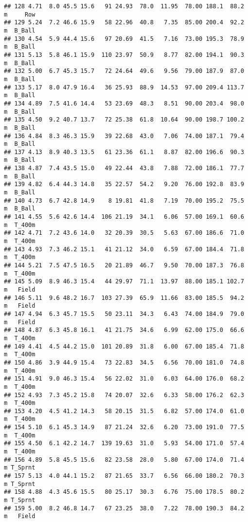 \documentclass[
]{article}
\begin{document}
\begin{verbatim}
## 128 4.71  8.0 45.5 15.6   91 24.93  78.0  11.95  78.00 188.1  88.2   m     Row
## 129 5.24  7.2 46.6 15.9   58 22.96  40.8   7.35  85.00 200.4  92.2   m  B_Ball
## 130 4.54  5.9 44.4 15.6   97 20.69  41.5   7.16  73.00 195.3  78.9   m  B_Ball
## 131 5.13  5.8 46.1 15.9  110 23.97  50.9   8.77  82.00 194.1  90.3   m  B_Ball
## 132 5.00  6.7 45.3 15.7   72 24.64  49.6   9.56  79.00 187.9  87.0   m  B_Ball
## 133 5.17  8.0 47.9 16.4   36 25.93  88.9  14.53  97.00 209.4 113.7   m  B_Ball
## 134 4.89  7.5 41.6 14.4   53 23.69  48.3   8.51  90.00 203.4  98.0   m  B_Ball
## 135 4.50  9.2 40.7 13.7   72 25.38  61.8  10.64  90.00 198.7 100.2   m  B_Ball
## 136 4.84  8.3 46.3 15.9   39 22.68  43.0   7.06  74.00 187.1  79.4   m  B_Ball
## 137 4.13  8.9 40.3 13.5   61 23.36  61.1   8.87  82.00 196.6  90.3   m  B_Ball
## 138 4.87  7.4 43.5 15.0   49 22.44  43.8   7.88  72.00 186.1  77.7   m  B_Ball
## 139 4.82  6.4 44.3 14.8   35 22.57  54.2   9.20  76.00 192.8  83.9   m  B_Ball
## 140 4.73  6.7 42.8 14.9    8 19.81  41.8   7.19  70.00 195.2  75.5   m  B_Ball
## 141 4.55  5.6 42.6 14.4  106 21.19  34.1   6.06  57.00 169.1  60.6   m  T_400m
## 142 4.71  7.2 43.6 14.0   32 20.39  30.5   5.63  67.00 186.6  71.0   m  T_400m
## 143 4.93  7.3 46.2 15.1   41 21.12  34.0   6.59  67.00 184.4  71.8   m  T_400m
## 144 5.21  7.5 47.5 16.5   20 21.89  46.7   9.50  70.00 187.3  76.8   m  T_400m
## 145 5.09  8.9 46.3 15.4   44 29.97  71.1  13.97  88.00 185.1 102.7   m   Field
## 146 5.11  9.6 48.2 16.7  103 27.39  65.9  11.66  83.00 185.5  94.2   m   Field
## 147 4.94  6.3 45.7 15.5   50 23.11  34.3   6.43  74.00 184.9  79.0   m   Field
## 148 4.87  6.3 45.8 16.1   41 21.75  34.6   6.99  62.00 175.0  66.6   m  T_400m
## 149 4.41  4.5 44.2 15.0  101 20.89  31.8   6.00  67.00 185.4  71.8   m  T_400m
## 150 4.86  3.9 44.9 15.4   73 22.83  34.5   6.56  70.00 181.0  74.8   m  T_400m
## 151 4.91  9.0 46.3 15.4   56 22.02  31.0   6.03  64.00 176.0  68.2   m  T_400m
## 152 4.93  7.3 45.2 15.8   74 20.07  32.6   6.33  58.00 176.2  62.3   m  T_400m
## 153 4.20  4.5 41.2 14.3   58 20.15  31.5   6.82  57.00 174.0  61.0   m  T_400m
## 154 5.10  6.1 45.3 14.9   87 21.24  32.6   6.20  73.00 191.0  77.5   m  T_400m
## 155 4.50  6.1 42.2 14.7  139 19.63  31.0   5.93  54.00 171.0  57.4   m  T_400m
## 156 4.89  5.8 45.5 15.6   82 23.58  28.0   5.80  67.00 174.0  71.4   m T_Sprnt
## 157 5.13  4.0 44.1 15.2   87 21.65  33.7   6.56  66.00 180.2  70.3   m T_Sprnt
## 158 4.88  4.3 45.6 15.5   80 25.17  30.3   6.76  75.00 178.5  80.2   m T_Sprnt
## 159 5.00  8.2 46.8 14.7   67 23.25  38.0   7.22  78.00 190.3  84.2   m   Field

\end{verbatim}
\end{document}
